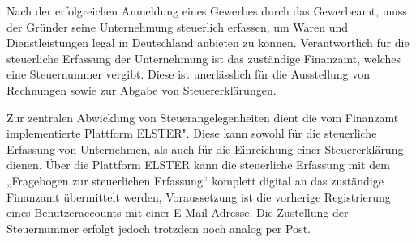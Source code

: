 Nach der erfolgreichen Anmeldung eines Gewerbes durch das Gewerbeamt, muss der Gründer seine Unternehmung steuerlich erfassen, um Waren und Dienstleistungen legal in Deutschland anbieten zu können.
 Verantwortlich für die steuerliche Erfassung der Unternehmung ist das zuständige Finanzamt, welches eine Steuernummer vergibt. Diese ist unerlässlich für die Ausstellung von Rechnungen sowie zur Abgabe von Steuererklärungen. 
 
 Zur zentralen Abwicklung von Steuerangelegenheiten dient die vom Finanzamt implementierte Plattform \"ELSTER".
 Diese kann sowohl für die steuerliche Erfassung von Unternehmen, als auch für die Einreichung einer Steuererklärung dienen. 
 Über die Plattform ELSTER kann die steuerliche Erfassung mit dem „Fragebogen zur steuerlichen Erfassung“ komplett digital an das zuständige Finanzamt übermittelt werden, Voraussetzung ist die vorherige Registrierung eines Benutzeraccounts mit einer E-Mail-Adresse. 
 Die Zustellung der Steuernummer erfolgt jedoch trotzdem noch analog per Post. 
